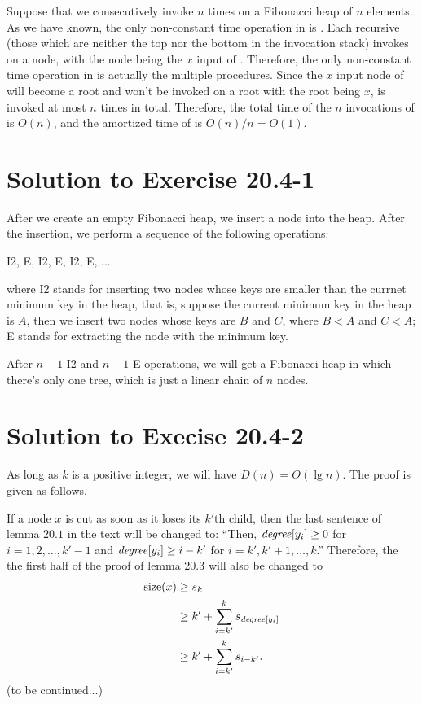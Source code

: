 \documentclass[a4paper, fleqn]{article}
\begin{document}
Suppose that we consecutively invoke  $n$
times on a Fibonacci heap of $n$ elements. As we have known, the only
non-constant time operation in  is
. Each recursive  (those which
are neither the top nor the bottom in the invocation stack) invokes
 on a node, with the node being the $x$ input of .
Therefore, the only non-constant time operation in
 is actually the multiple 
procedures. Since the $x$ input node of  will become a root
and  won't be invoked on a root with the root being $x$,
 is invoked at most $n$ times in total. Therefore, the total
time of the $n$ invocations of  is $O(n)$,
and the amortized time of  is $O(n) / n =
O(1)$.






\section*{Solution to Exercise 20.4-1}

After we create an empty Fibonacci heap, we insert a node into the
heap. After the insertion, we perform a sequence of the following
operations:

\noindent
I2, E, I2, E, I2, E, ...

\noindent
where I2 stands for inserting two nodes whose keys are smaller than
the currnet minimum key in the heap, that is, suppose the current
minimum key in the heap is $A$, then we insert two nodes whose keys
are $B$ and $C$, where $B < A$ and $C < A$; E stands for extracting
the node with the minimum key.

After $n-1$ I2 and $n-1$ E operations, we will get a Fibonacci heap in
which there's only one tree, which is just a linear chain of $n$
nodes.






\section*{Solution to Execise 20.4-2}

As long as $k$ is a positive integer, we will have $D(n) = O(\lg
n)$. The proof is given as follows.

If a node $x$ is cut as soon as it loses its $k'$th child, then the
last sentence of lemma $20.1$ in the text will be changed to: ``Then,
$\id{degree}[y_i] \geq 0$ for $i = 1, 2, \ldots, k' - 1$ and
$\id{degree}[y_i] \geq i - k'$ for $i = k', k' + 1, \ldots, k$.''
Therefore, the the first half of the proof of lemma 20.3 will also be
changed to
\begin{align*}
\mbox{size}(x) &\geq s_k \\
               &\geq k' + \sum_{i = k'}^k s_{\id{degree}[y_i]} \\
	       &\geq k' + \sum_{i = k'}^k s_{i - k'}.
\end{align*}
(to be continued...)
\end{document}
